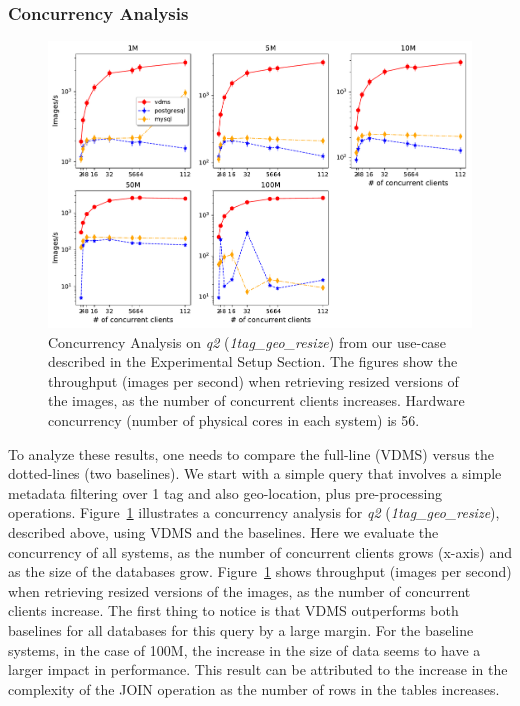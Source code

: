 
\subsubsection{Concurrency Analysis} \label{concurrency_analysis}

\begin{figure}[ht]
\includegraphics[width=\columnwidth]{figures/plot_conc_q_1tag_geo_resize_mosaic_results_throughput_db_size}
\caption{Concurrency Analysis on \textit{q2} (\textit{1tag\_geo\_resize}) from our use-case
described in the Experimental Setup Section.
The figures show the throughput (images per second) when retrieving
resized versions of the images, as the number of concurrent clients increases.
Hardware concurrency (number of physical cores in each system)
is 56.}
\label{fig:concurrency_comparison_q2}
\end{figure}

To analyze these results, one needs to compare the full-line (VDMS) versus the
dotted-lines (two baselines).
We start with a simple query that involves a simple
metadata filtering over 1 tag and also geo-location,
plus pre-processing operations.
Figure~\ref{fig:concurrency_comparison_q2} illustrates a concurrency analysis
for \textit{q2} (\textit{1tag\_geo\_resize}), described above,
using VDMS and the baselines.
Here we evaluate the concurrency of all systems, as the number of concurrent
clients grows (x-axis) and as the size of the databases grow.
Figure~\ref{fig:concurrency_comparison_q2} shows throughput (images per second)
when retrieving resized versions of the images, as the number of
concurrent clients increase.
The first thing to notice is that VDMS outperforms both baselines for all
databases for this query by a large margin.
For the baseline systems, in the case of 100M, the increase in the
size of data seems to have a larger impact in performance.
This result can be attributed to the increase in the complexity of the JOIN
operation as the number of rows in the tables increases.

